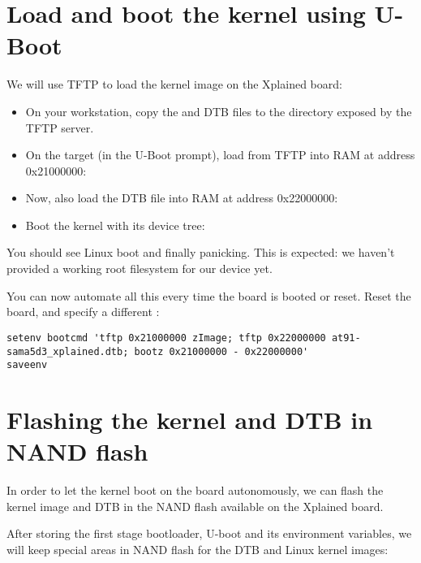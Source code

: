 \section{Load and boot the kernel using U-Boot}

We will use TFTP to load the kernel image on the Xplained board:

\begin{itemize}

\item On your workstation, copy the  and DTB files to the
  directory exposed by the TFTP server.

\item On the target (in the U-Boot prompt), load  from
  TFTP into RAM at address 0x21000000:\\

\item Now, also load the DTB file into RAM at address 0x22000000:\\

\item Boot the kernel with its device tree:\\

\end{itemize}

You should see Linux boot and finally panicking. This is expected: we
haven't provided a working root filesystem for our device yet.

You can now automate all this every time the board is booted or
reset. Reset the board, and specify a different :

{\scriptsize
\begin{verbatim}
setenv bootcmd 'tftp 0x21000000 zImage; tftp 0x22000000 at91-sama5d3_xplained.dtb; bootz 0x21000000 - 0x22000000'
saveenv
\end{verbatim}
}

\section{Flashing the kernel and DTB in NAND flash}

In order to let the kernel boot on the board autonomously, we can
flash the kernel image and DTB in the NAND flash available on the
Xplained board.

After storing the first stage bootloader, U-boot and its environment
variables, we will keep special areas in NAND flash for the DTB
and Linux kernel images:

